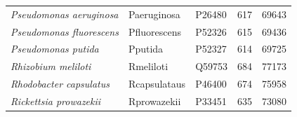 \begin{table}
\begin{minipage}[c]{\textwidth}
\begin{narrow}{-1in}{-1in}
\begin{small}
\begin{tabular}{@{}llllp{.7in}@{}}
{\it Pseudomonas aeruginosa} & Paeruginosa &     P26480 &        617 &      69643 \\

{\it Pseudomonas fluorescens} & Pfluorescens &     P52326 &        615 &      69436 \\

{\it Pseudomonas putida} &    Pputida &     P52327 &        614 &      69725 \\

{\it Rhizobium meliloti}  &  Rmeliloti &     Q59753 &        684 &      77173 \\

{\it Rhodobacter capsulatus} & Rcapsulataus &     P46400 &        674 &      75958 \\

{\it Rickettsia prowazekii} & Rprowazekii &     P33451 & 635 &
73080 \\\bottomrule


\end{tabular}
\end{small}
\end{narrow}
\end{minipage}
\linespread{1.1}\normalsize
\end{table}
